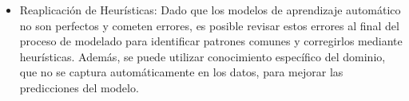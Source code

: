 \begin{itemize}
\item Reaplicación de Heurísticas: Dado que los modelos de aprendizaje automático no son perfectos y cometen errores, es posible revisar estos errores al final del proceso de modelado para identificar patrones comunes y corregirlos mediante heurísticas. Además, se puede utilizar conocimiento específico del dominio, que no se captura automáticamente en los datos, para mejorar las predicciones del modelo.

\end{itemize}


